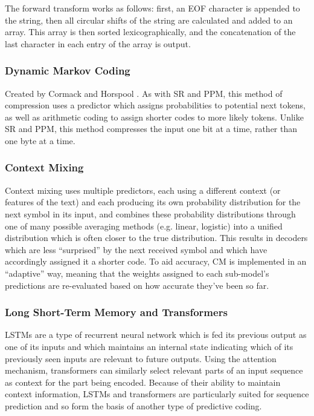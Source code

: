 The forward transform works as follows: first, an EOF character is appended to the string, then all circular shifts of the string are calculated and added to an array. This array is then sorted lexicographically, and the concatenation of the last character in each entry of the array is output.

\subsubsection{Dynamic Markov Coding}
Created by Cormack and Horspool \autocite{Cormack1987}. As with SR and PPM, this method of compression uses a predictor which assigns probabilities to potential next tokens, as well as arithmetic coding to assign shorter codes to more likely tokens. Unlike SR and PPM, this method compresses the input one bit at a time, rather than one byte at a time.

\subsubsection{Context Mixing}
Context mixing uses multiple predictors, each using a different context (or features of the text) and each producing its own probability distribution for the next symbol in its input, and combines these probability distributions through one of many possible averaging methods (e.g. linear, logistic) into a unified distribution which is often closer to the true distribution. This results in decoders which are less “surprised” by the next received symbol and which have accordingly assigned it a shorter code. To aid accuracy, CM is implemented in an “adaptive” way, meaning that the weights assigned to each sub-model’s predictions are re-evaluated based on how accurate they’ve been so far. \autocite{Mahoney2005}

\subsubsection{Long Short-Term Memory and Transformers}
LSTMs are a type of recurrent neural network which is fed its previous output as one of its inputs and which maintains an internal state indicating which of its previously seen inputs are relevant to future outputs. Using the attention mechanism, transformers can similarly select relevant parts of an input sequence as context for the part being encoded. Because of their ability to maintain context information, LSTMs and transformers are particularly suited for sequence prediction and so form the basis of another type of predictive coding.